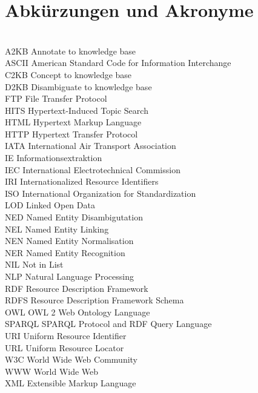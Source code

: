 \section{Abkürzungen und Akronyme}
\label{akro}
\begin{tabbing}
\hspace*{3cm}\=  \\ \kill
A2KB     \> Annotate to knowledge base\\
ASCII    \> American Standard Code for Information Interchange\\
C2KB     \> Concept to knowledge base\\
D2KB     \> Disambiguate to knowledge base\\
FTP      \> File Transfer Protocol\\
HITS     \> Hypertext-Induced Topic Search\\
HTML     \> Hypertext Markup Language\\
HTTP     \> Hypertext Transfer Protocol\\
IATA     \> International Air Transport Association\\
IE       \> Informationsextraktion\\
IEC      \> International Electrotechnical Commission\\
IRI      \> Internationalized Resource Identifiers\\
ISO      \> International Organization for Standardization\\
LOD      \> Linked Open Data\\
NED      \> Named Entity Disambigutation\\
NEL      \> Named Entity Linking\\
NEN      \> Named Entity Normalisation\\
NER      \> Named Entity Recognition\\
NIL      \> Not in List\\
NLP      \> Natural Language Processing\\
RDF      \> Resource Description Framework\\
RDFS     \> Resource Description Framework Schema\\
OWL      \> OWL 2 Web Ontology Language\\
SPARQL   \> SPARQL Protocol and RDF Query Language\\
URI      \> Uniform Resource Identifier\\
URL      \> Uniform Resource Locator\\
W3C      \> World Wide Web Community\\
WWW      \> World Wide Web\\
XML      \> Extensible Markup Language\\
\end{tabbing}
\newpage
